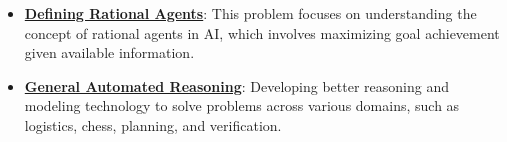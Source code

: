 \documentclass{article}%
\begin{document}
\begin{itemize}[leftmargin=*]
\item \href{https://purdue.brightspace.com/d2l/common/assets/pdfjs-d2l-dist/1.0.14-legacy/web/viewer.html?file=\%2Fcontent\%2Fenforced\%2F1095467-wl.202510.CS.24300.001\%2F14L1-DepthFS.pdf\%3Fou\%3D1095467\&lang=en-us\&container=d2l-fileviewer-rendered-pdf\&fullscreen=d2l-fileviewer-rendered-pdf-dialog\&height=667#page=39}{\textbf{Defining Rational Agents}}: This problem focuses on understanding the concept of rational agents in AI, which involves maximizing goal achievement given available information.%
\item \href{https://purdue.brightspace.com/d2l/common/assets/pdfjs-d2l-dist/1.0.14-legacy/web/viewer.html?file=\%2Fcontent\%2Fenforced\%2F1095467-wl.202510.CS.24300.001\%2F15L2-SAT.pdf\%3Fou\%3D1095467\&lang=en-us\&container=d2l-fileviewer-rendered-pdf\&fullscreen=d2l-fileviewer-rendered-pdf-dialog\&height=667#page=3}{\textbf{General Automated Reasoning}}: Developing better reasoning and modeling technology to solve problems across various domains, such as logistics, chess, planning, and verification.%
\end{itemize}

%
\end{document}
